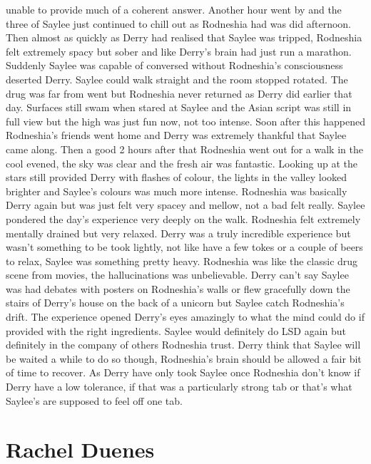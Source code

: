 \documentclass[12pt]{book}
\begin{document}
unable to provide much of a coherent answer. Another hour went by and the three of Saylee just continued to chill out as Rodneshia had was did afternoon. Then almost as quickly as Derry had realised that Saylee was tripped, Rodneshia felt extremely spacy but sober and like Derry's brain had just run a marathon. Suddenly Saylee was capable of conversed without Rodneshia's consciousness deserted Derry. Saylee could walk straight and the room stopped rotated. The drug was far from went but Rodneshia never returned as Derry did earlier that day. Surfaces still swam when stared at Saylee and the Asian script was still in full view but the high was just fun now, not too intense. Soon after this happened Rodneshia's friends went home and Derry was extremely thankful that Saylee came along. Then a good 2 hours after that Rodneshia went out for a walk in the cool evened, the sky was clear and the fresh air was fantastic. Looking up at the stars still provided Derry with flashes of colour, the lights in the valley looked brighter and Saylee's colours was much more intense. Rodneshia was basically Derry again but was just felt very spacey and mellow, not a bad felt really. Saylee pondered the day's experience very deeply on the walk. Rodneshia felt extremely mentally drained but very relaxed. Derry was a truly incredible experience but wasn't something to be took lightly, not like have a few tokes or a couple of beers to relax, Saylee was something pretty heavy. Rodneshia was like the classic drug scene from movies, the hallucinations was unbelievable. Derry can't say Saylee was had debates with posters on Rodneshia's walls or flew gracefully down the stairs of Derry's house on the back of a unicorn but Saylee catch Rodneshia's drift. The experience opened Derry's eyes amazingly to what the mind could do if provided with the right ingredients. Saylee would definitely do LSD again but definitely in the company of others Rodneshia trust. Derry think that Saylee will be waited a while to do so though, Rodneshia's brain should be allowed a fair bit of time to recover. As Derry have only took Saylee once Rodneshia don't know if Derry have a low tolerance, if that was a particularly strong tab or that's what Saylee's are supposed to feel off one tab.



\chapter{Rachel Duenes}
\end{document}

